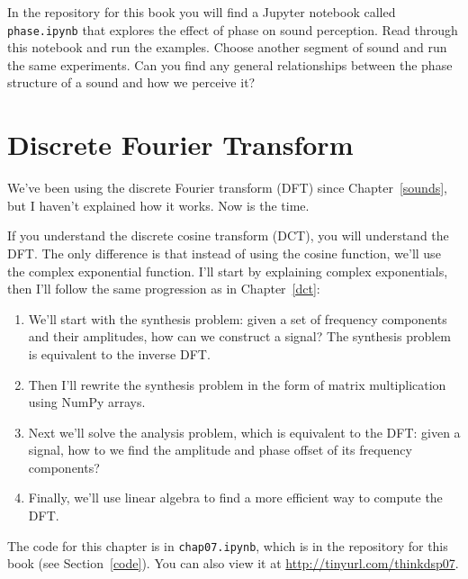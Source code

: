 \documentclass[12pt]{book}
\begin{document}
\begin{exercise}
In the repository for this book you will find a Jupyter notebook
called \verb"phase.ipynb" that explores the effect of phase on sound
perception.
Read through this notebook and run the examples.  
Choose another segment of sound and run the same experiments.
Can you find any general relationships between the phase structure
of a sound and how we perceive it?
\end{exercise}




\chapter{Discrete Fourier Transform}
\label{dft}

We've been using the discrete Fourier transform (DFT) since
Chapter~\ref{sounds}, but I haven't explained how it works.  Now is
the time.

If you understand the discrete cosine transform (DCT), you will
understand the DFT.  The only difference is that instead of using the
cosine function, we'll use the complex exponential function.  I'll
start by explaining complex exponentials, then I'll follow the
same progression as in Chapter~\ref{dct}:

\begin{enumerate}

\item We'll start with the synthesis
  problem: given a set of frequency components and their amplitudes,
  how can we construct a signal?  The synthesis problem is 
  equivalent to the inverse DFT.

\item Then I'll rewrite the synthesis problem in the form of matrix
  multiplication using NumPy arrays.

\item Next we'll solve the analysis problem, which is equivalent to
  the DFT: given a signal, how to we find the amplitude and phase
  offset of its frequency components?

\item Finally, we'll use linear algebra to find a more efficient way
  to compute the DFT.

\end{enumerate}

The code for this chapter is in {\tt chap07.ipynb}, which is in the
repository for this book (see Section~\ref{code}).
You can also view it at \url{http://tinyurl.com/thinkdsp07}.
\end{document}

